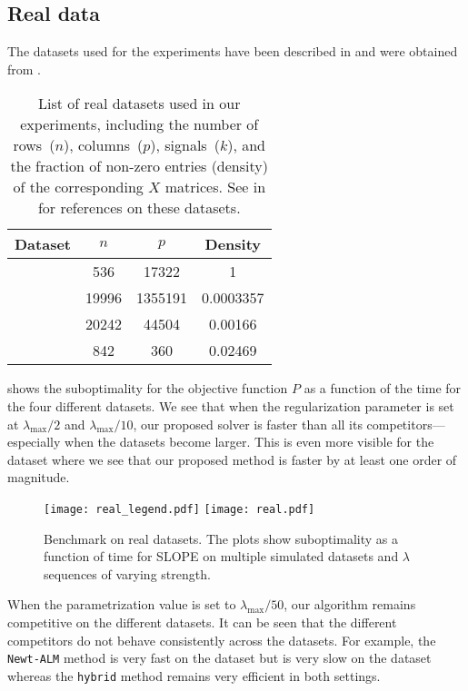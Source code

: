 \subsection{Real data}
\label{sec:experiments-real-data}

The datasets used for the experiments have been described in  and were obtained from \textcite{chang2011,chang2016,breheny2022}.

\begin{table}[hbt]
  \centering
  \caption{%
    List of real datasets used in our experiments, including 
    the number of rows~(\(n\)), columns~(\(p\)), signals~(\(k\)), and the
    fraction of non-zero entries (density) of the corresponding \(X\) matrices.
    See  in  for references on these datasets.
  }
  \label{tab:real-data}
  \begin{tabular}{
      l
      S[table-format=5.0,round-mode=off]
      S[table-format=7.0,round-mode=off]
      S[table-format=1.5,round-mode=figures,round-precision=2]
    }
    \toprule
    Dataset            & {\(n\)} & {\(p\)} & {Density} \\ \midrule
       & 536     & 17322   & 1         \\
       & 19996   & 1355191 & 0.0003357 \\
         & 20242   & 44504   & 0.00166   \\
     & 842     & 360     & 0.02469   \\ \bottomrule
  \end{tabular}
\end{table}

 shows the suboptimality for the objective function $P$ as a function of the time for the four different datasets.
We see that when the regularization parameter is set at $\lambda_{\text{max}}/2$ and $\lambda_{\text{max}}/10$, our proposed solver is faster than all its competitors---especially when the datasets become larger.
This is even more visible for the  dataset where we see that our proposed method is faster by at least one order of magnitude.

\begin{figure*}[!t]
  \centering
  \texttt{[image: real\_legend.pdf]}
  \texttt{[image: real.pdf]}
  \caption{Benchmark on real datasets. The plots show suboptimality as a function of time for SLOPE on multiple simulated datasets and $\lambda$ sequences of varying strength.}
  \label{fig:real-data}
\end{figure*}



When the parametrization value is set to $\lambda_{\text{max}}/50$, our algorithm remains competitive on the different datasets.
It can be seen that the different competitors do not behave consistently across the datasets.
For example, the \texttt{Newt-ALM} method is very fast on the  dataset but is very slow on the  dataset whereas the \texttt{hybrid} method remains very efficient in both settings.
